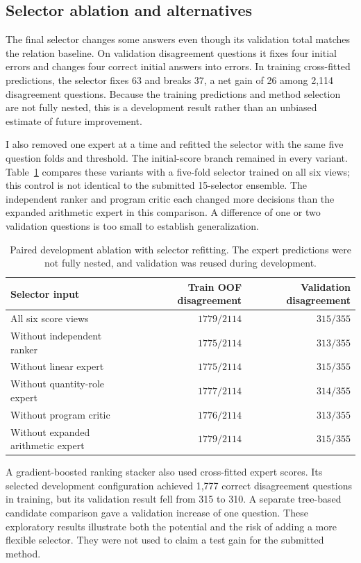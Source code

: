 \documentclass[10pt]{article}
\begin{document}
\subsection{Selector ablation and alternatives}
The final selector changes some answers even though its validation total matches the relation baseline. On validation disagreement questions it fixes four initial errors and changes four correct initial answers into errors. In training cross-fitted predictions, the selector fixes 63 and breaks 37, a net gain of 26 among 2,114 disagreement questions. Because the training predictions and method selection are not fully nested, this is a development result rather than an unbiased estimate of future improvement.

I also removed one expert at a time and refitted the selector with the same five question folds and threshold. The initial-score branch remained in every variant. Table~\ref{tab:ablation} compares these variants with a five-fold selector trained on all six views; this control is not identical to the submitted 15-selector ensemble. The independent ranker and program critic each changed more decisions than the expanded arithmetic expert in this comparison. A difference of one or two validation questions is too small to establish generalization.
\begin{table}[ht]
\centering\small
\begin{tabular}{lrr}
\toprule
Selector input & Train OOF disagreement & Validation disagreement \\
\midrule
All six score views & $1779/2114$ & $315/355$ \\
Without independent ranker & $1775/2114$ & $313/355$ \\
Without linear expert & $1775/2114$ & $315/355$ \\
Without quantity-role expert & $1777/2114$ & $314/355$ \\
Without program critic & $1776/2114$ & $313/355$ \\
Without expanded arithmetic expert & $1779/2114$ & $315/355$ \\
\bottomrule
\end{tabular}
\caption{Paired development ablation with selector refitting. The expert predictions were not fully nested, and validation was reused during development.}
\label{tab:ablation}
\end{table}

A gradient-boosted ranking stacker also used cross-fitted expert scores. Its selected development configuration achieved 1,777 correct disagreement questions in training, but its validation result fell from 315 to 310. A separate tree-based candidate comparison gave a validation increase of one question. These exploratory results illustrate both the potential and the risk of adding a more flexible selector. They were not used to claim a test gain for the submitted method.
\end{document}
